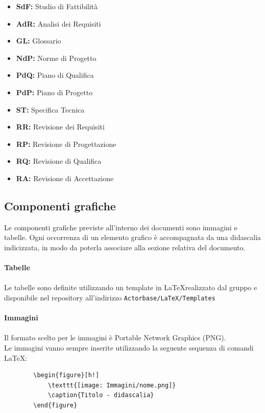 \documentclass[a4paper]{report}
\begin{document}
	\begin{itemize}
		\item \textbf{SdF:} Studio di Fattibilità
		\item \textbf{AdR:} Analisi dei Requisiti
		\item \textbf{GL:} Glossario
		\item \textbf{NdP:} Norme di Progetto
		\item \textbf{PdQ:} Piano di Qualifica
		\item \textbf{PdP:} Piano di Progetto
		\item \textbf{ST:} Specifica Tecnica
		\item \textbf{RR:} Revisione dei Requisiti
		\item \textbf{RP:} Revisione di Progettazione
		\item \textbf{RQ:} Revisione di Qualifica
		\item \textbf{RA:} Revisione di Accettazione
	\end{itemize}
	\subsection{Componenti grafiche}
	Le componenti grafiche previste all'interno dei documenti sono immagini e tabelle. Ogni occorrenza di un
	elemento grafico è accompagnata da una didascalia indicizzata, in modo da poterla associare alla sezione 
	relativa del documento. \\ \\
	\textbf{Tabelle} \\ \\ 
	Le tabelle sono definite utilizzando un template in \LaTeX \space realizzato dal gruppo e disponibile nel 
	repository all'indirizzo \verb|Actorbase/LaTeX/Templates| \\ \\ 
	\textbf{Immagini}  \\ \\
	Il formato scelto per le immagini è Portable Network Graphics (PNG). \\
	Le immagini vanno sempre inserite utilizzando la seguente sequenza di comandi \LaTeX:
	\begin{verbatim}
		\begin{figure}[h!]
			\texttt{[image: Immagini/nome.png]}
			\caption{Titolo - didascalia}
		\end{figure}
	\end{verbatim}
\end{document}
